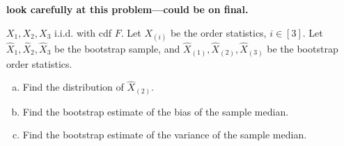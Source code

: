 \begin{exercise} \textbf{look carefully at this problem---could be on final.}


\(X_1, X_2, X_3\) i.i.d. with cdf \(F\). Let \(X_{(i)}\) be the order statistics, \(i \in [3]\). Let \(\hat{X}_1, \hat{X}_2, \hat{X}_3\) be the bootstrap sample, and \(\hat{X}_{(1)}, \hat{X}_{(2)}, \hat{X}_{(3)}\) be the bootstrap order statistics.

\begin{enumerate}[(a)]

\item Find the distribution of \(\hat{X}_{(2)}\).

\item Find the bootstrap estimate of the bias of the sample median.

\item Find the bootstrap estimate of the variance of the sample median.

\end{enumerate}

\end{exercise}

